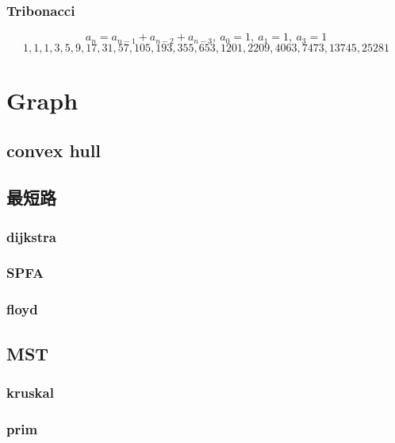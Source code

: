 \subsubsection{Tribonacci}
\[a_{n} = a_{n-1} + a_{n-2} + a_{n-3},\ a_0 = 1,\ a_1 = 1,\ a_3 = 1\]
\[1, 1, 1, 3, 5, 9, 17, 31, 57, 105, 193, 355, 653, 1201, 2209, 4063, 7473, 13745, 25281\]

\section{Graph}

\subsection{convex hull}


\subsection{最短路}
\subsubsection{dijkstra}


\subsubsection{SPFA}


\subsubsection{floyd}


\subsection{MST}
\subsubsection{kruskal}


\subsubsection{prim}


